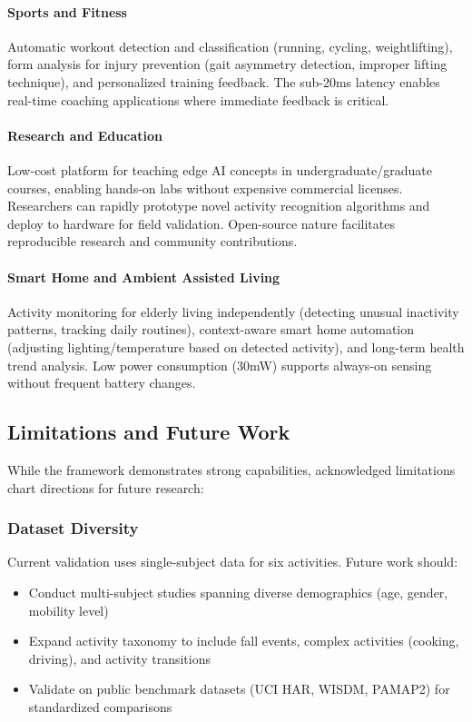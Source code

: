 \paragraph{Sports and Fitness}
Automatic workout detection and classification (running, cycling, weightlifting), form analysis for injury prevention (gait asymmetry detection, improper lifting technique), and personalized training feedback. The sub-20ms latency enables real-time coaching applications where immediate feedback is critical.

\paragraph{Research and Education}
Low-cost platform for teaching edge AI concepts in undergraduate/graduate courses, enabling hands-on labs without expensive commercial licenses. Researchers can rapidly prototype novel activity recognition algorithms and deploy to hardware for field validation. Open-source nature facilitates reproducible research and community contributions.

\paragraph{Smart Home and Ambient Assisted Living}
Activity monitoring for elderly living independently (detecting unusual inactivity patterns, tracking daily routines), context-aware smart home automation (adjusting lighting/temperature based on detected activity), and long-term health trend analysis. Low power consumption (30mW) supports always-on sensing without frequent battery changes.

\subsection{Limitations and Future Work}

While the framework demonstrates strong capabilities, acknowledged limitations chart directions for future research:

\subsubsection{Dataset Diversity}
Current validation uses single-subject data for six activities. Future work should:
\begin{itemize}
    \item Conduct multi-subject studies spanning diverse demographics (age, gender, mobility level)
    \item Expand activity taxonomy to include fall events, complex activities (cooking, driving), and activity transitions
    \item Validate on public benchmark datasets (UCI HAR, WISDM, PAMAP2) for standardized comparisons
\end{itemize}

